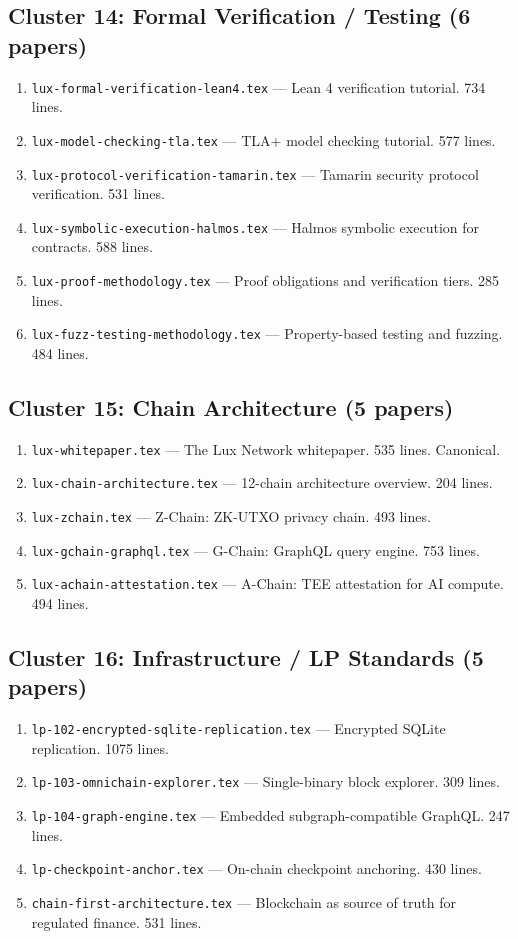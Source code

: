 \documentclass[11pt,a4paper]{article}
\begin{document}
\subsection{Cluster 14: Formal Verification / Testing (6 papers)}
\begin{enumerate}[leftmargin=2em]
\item \texttt{lux-formal-verification-lean4.tex} --- Lean 4 verification tutorial. 734 lines.
\item \texttt{lux-model-checking-tla.tex} --- TLA+ model checking tutorial. 577 lines.
\item \texttt{lux-protocol-verification-tamarin.tex} --- Tamarin security protocol verification. 531 lines.
\item \texttt{lux-symbolic-execution-halmos.tex} --- Halmos symbolic execution for contracts. 588 lines.
\item \texttt{lux-proof-methodology.tex} --- Proof obligations and verification tiers. 285 lines.
\item \texttt{lux-fuzz-testing-methodology.tex} --- Property-based testing and fuzzing. 484 lines.
\end{enumerate}

\subsection{Cluster 15: Chain Architecture (5 papers)}
\begin{enumerate}[leftmargin=2em]
\item \texttt{lux-whitepaper.tex} --- The Lux Network whitepaper. 535 lines. Canonical.
\item \texttt{lux-chain-architecture.tex} --- 12-chain architecture overview. 204 lines.
\item \texttt{lux-zchain.tex} --- Z-Chain: ZK-UTXO privacy chain. 493 lines.
\item \texttt{lux-gchain-graphql.tex} --- G-Chain: GraphQL query engine. 753 lines.
\item \texttt{lux-achain-attestation.tex} --- A-Chain: TEE attestation for AI compute. 494 lines.
\end{enumerate}

\subsection{Cluster 16: Infrastructure / LP Standards (5 papers)}
\begin{enumerate}[leftmargin=2em]
\item \texttt{lp-102-encrypted-sqlite-replication.tex} --- Encrypted SQLite replication. 1075 lines.
\item \texttt{lp-103-omnichain-explorer.tex} --- Single-binary block explorer. 309 lines.
\item \texttt{lp-104-graph-engine.tex} --- Embedded subgraph-compatible GraphQL. 247 lines.
\item \texttt{lp-checkpoint-anchor.tex} --- On-chain checkpoint anchoring. 430 lines.
\item \texttt{chain-first-architecture.tex} --- Blockchain as source of truth for regulated finance. 531 lines.
\end{enumerate}
\end{document}
